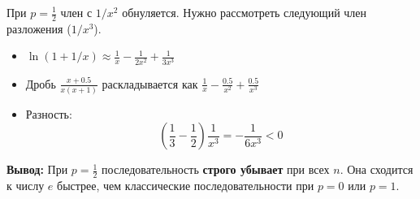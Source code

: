 \begin{tcolorbox}[title=Случай p = 1/2]
	При $p=\frac{1}{2}$ член с $1/x^2$ обнуляется. Нужно рассмотреть следующий член разложения ($1/x^3$).
	\begin{itemize}
		\item $\ln(1+1/x) \approx \frac{1}{x} - \frac{1}{2x^2} + \frac{1}{3x^3}$
		\item Дробь $\frac{x+0.5}{x(x+1)}$ раскладывается как $\frac{1}{x} - \frac{0.5}{x^2} + \frac{0.5}{x^3}$
		\item Разность:
		$$ \left(\frac{1}{3} - \frac{1}{2}\right)\frac{1}{x^3} = -\frac{1}{6x^3} < 0 $$
	\end{itemize}
	\textbf{Вывод:} При $p=\frac{1}{2}$ последовательность \textbf{строго убывает} при всех $n$. Она сходится к числу $e$ быстрее, чем классические последовательности при $p=0$ или $p=1$.
\end{tcolorbox}

